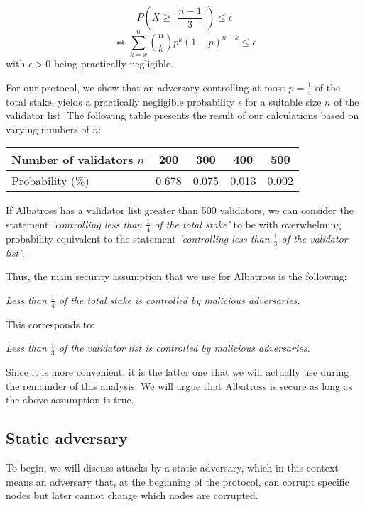 \documentclass[conference]{IEEEtran}
\begin{document}
\[P(X \geq \lfloor \frac{n-1}{3} \rfloor) \leq \epsilon\]
\[\Leftrightarrow \sum_{k=x}^{n} \binom{n}{k} p^k (1-p)^{n-k} \leq \epsilon\]
with $\epsilon > 0$ being practically negligible.

For our protocol, we show that an adversary controlling at most $p=\frac{1}{4}$ of the total stake, yields a practically negligible probability $\epsilon$ for a suitable size $n$ of the validator list. The following table presents the result of our calculations based on varying numbers of $n$:

\begin{center}
	\begin{tabular}[c]{l||c|c|c|c}
		Number of validators $n$ & 200 & 300 & 400 & 500 \\
		\hline
		Probability (\%) & 0.678 & 0.075 & 0.013 & 0.002 \\
	\end{tabular}
\end{center}

If Albatross has a validator list greater than 500 validators, we can consider the statement \textit{'controlling less than $\frac{1}{4}$ of the total stake'} to be with overwhelming probability equivalent to the statement \textit{'controlling less than $\frac{1}{3}$ of the validator list'}.

Thus, the main security assumption that we use for Albatross is the following:
\begin{center}
	\textit{Less than $\frac{1}{4}$ of the total stake is controlled by malicious adversaries.}
\end{center}

This corresponds to:
\begin{center}
	\textit{Less than $\frac{1}{3}$ of the validator list is controlled by malicious adversaries.}
\end{center}

Since it is more convenient, it is the latter one that we will actually use during the remainder of this analysis. We will argue that Albatross is secure as long as the above assumption is true.

\subsection{Static adversary}
To begin, we will discuss attacks by a static adversary, which in this context means an adversary that, at the beginning of the protocol, can corrupt specific nodes but later cannot change which nodes are corrupted.
\end{document}
